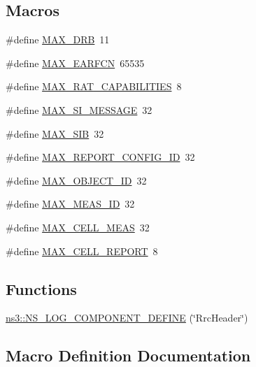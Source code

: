 \subsection*{Macros}
\begin{DoxyCompactItemize}
\item 
\#define \hyperlink{lte-rrc-header_8cc_a3007772924a76edef0d1eb9c400abdac}{M\+A\+X\+\_\+\+D\+RB}~11
\item 
\#define \hyperlink{lte-rrc-header_8cc_a7851a91be0aab6446639f0ff8ee48b45}{M\+A\+X\+\_\+\+E\+A\+R\+F\+CN}~65535
\item 
\#define \hyperlink{lte-rrc-header_8cc_ac4d6753fe892830703ec19f19470b9a0}{M\+A\+X\+\_\+\+R\+A\+T\+\_\+\+C\+A\+P\+A\+B\+I\+L\+I\+T\+I\+ES}~8
\item 
\#define \hyperlink{lte-rrc-header_8cc_a99fed6f03b7fffb57efc4c875d0446b1}{M\+A\+X\+\_\+\+S\+I\+\_\+\+M\+E\+S\+S\+A\+GE}~32
\item 
\#define \hyperlink{lte-rrc-header_8cc_a6cc8a5c99fe3f31ebb69f4eb23916dcd}{M\+A\+X\+\_\+\+S\+IB}~32
\item 
\#define \hyperlink{lte-rrc-header_8cc_af8a3b931c04f0fa0e31e7c8480ba0bb6}{M\+A\+X\+\_\+\+R\+E\+P\+O\+R\+T\+\_\+\+C\+O\+N\+F\+I\+G\+\_\+\+ID}~32
\item 
\#define \hyperlink{lte-rrc-header_8cc_ab2de695aee029784062779621283535d}{M\+A\+X\+\_\+\+O\+B\+J\+E\+C\+T\+\_\+\+ID}~32
\item 
\#define \hyperlink{lte-rrc-header_8cc_aa360afec99420ceee80ed487493f6a9d}{M\+A\+X\+\_\+\+M\+E\+A\+S\+\_\+\+ID}~32
\item 
\#define \hyperlink{lte-rrc-header_8cc_a1d57dacc17deb664f3250c8c9bc5ba0e}{M\+A\+X\+\_\+\+C\+E\+L\+L\+\_\+\+M\+E\+AS}~32
\item 
\#define \hyperlink{lte-rrc-header_8cc_a0a29c59f448f689482054e43277599ab}{M\+A\+X\+\_\+\+C\+E\+L\+L\+\_\+\+R\+E\+P\+O\+RT}~8
\end{DoxyCompactItemize}
\subsection*{Functions}
\begin{DoxyCompactItemize}
\item 
\hyperlink{namespacens3_ac104184654677a615f961897b8945a7d}{ns3\+::\+N\+S\+\_\+\+L\+O\+G\+\_\+\+C\+O\+M\+P\+O\+N\+E\+N\+T\+\_\+\+D\+E\+F\+I\+NE} (\char`\"{}Rrc\+Header\char`\"{})
\end{DoxyCompactItemize}


\subsection{Macro Definition Documentation}
